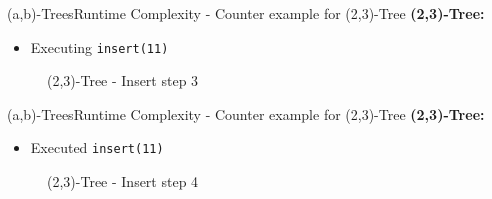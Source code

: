 
\begin{frame}{(a,b)-Trees}{Runtime Complexity - Counter example for (2,3)-Tree}
  \textbf{(2,3)-Tree:}
  \begin{itemize}
    \item
      Executing \texttt{\color{Mittel-Blau}insert(11)}
  \end{itemize}
  \begin{figure}
    \begin{adjustbox}{width=0.7\linewidth}
      
    \end{adjustbox}
    \label{fig:a_b_tree:2_3_tree_8}
    \caption{(2,3)-Tree - Insert step 3}
  \end{figure}
\end{frame}


\begin{frame}{(a,b)-Trees}{Runtime Complexity - Counter example for (2,3)-Tree}
  \textbf{(2,3)-Tree:}
  \begin{itemize}
    \item
      Executed \texttt{\color{Mittel-Blau}insert(11)}
  \end{itemize}
  \begin{figure}
    \begin{adjustbox}{width=0.6\linewidth}
      
    \end{adjustbox}
    \label{fig:a_b_tree:2_3_tree_9}
    \caption{(2,3)-Tree - Insert step 4}
  \end{figure}
\end{frame}


